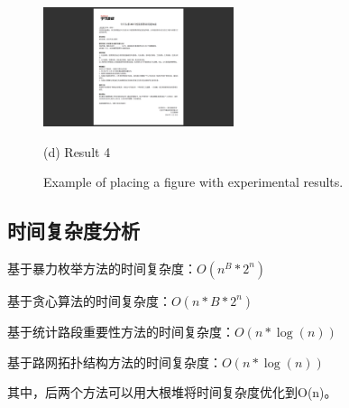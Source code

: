 \begin{figure}
				\hfill
				\begin{minipage}{0.48\linewidth}
				  \centerline{\includegraphics[width=2.2in]{picture/test1}}
				  \centerline{(d) Result 4}
				\end{minipage}
				\caption{Example of placing a figure with experimental results.}
				\label{fig2}
				\end{figure}

			\subsection{时间复杂度分析}
				基于暴力枚举方法的时间复杂度：$O({n^B}*{2^n})$

				基于贪心算法的时间复杂度：$O(n*B*{2^n})$

				基于统计路段重要性方法的时间复杂度：$O(n*\log (n))$

				基于路网拓扑结构方法的时间复杂度：$O(n*\log (n))$

				其中，后两个方法可以用大根堆将时间复杂度优化到O(n)。





			
